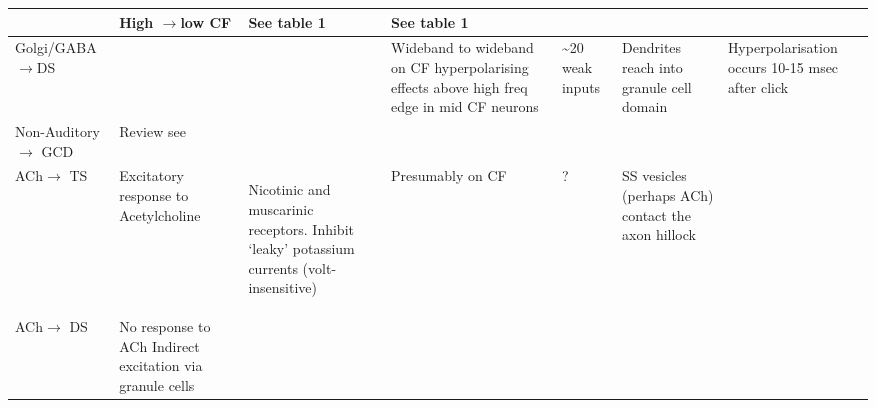 \documentclass[10pt,a4paper]{article}
\begin{document}
\begin{landscape}
\begin{supertabular}{|m{2.121cm}|m{2.899cm}|m{2.243cm}|m{2.986cm}|m{2.294cm}|m{2.245cm}|m{3.303cm}|}
                   \citep{AwatramaniTurecekEtAl:2005}                     & High \ensuremath{\rightarrow}low CF
                      \citep{JosephsonMorest:1998}                        &    See table 1 \citep{SmithRhode:1989}     & See
                     table 1 \citep{SmithRhode:1989}                      & \\\hline
Golgi/GABA
                       \ensuremath{\rightarrow}DS                         & 
\citep{EvansZhao:1998,FerragamoGoldingEtAl:1998a,Mugnaini:1985,MugnainiOsenEtAl:1980,
                          SaintMorestEtAl:1989}                           &                                            & Wideband to wideband on CF
\citep{EvansZhao:1998} hyperpolarising effects above high freq edge in mid
                  CF neurons \citep{PaoliniClark:1999}                    & \~{}20 weak
                   inputs\citep{SaintMorestEtAl:1989}                     & 

   Dendrites reach into granule cell domain \citep{OertelWuEtAl:1990}     & 

Hyperpolarisation occurs 10-15 msec after click
\citep{PaoliniClark:1999}\\\hline
Non-Auditory \ensuremath{\rightarrow} GCD
                                                                          & Review see \citep{OhlroggeDoucetEtAl:2001} &   & & & & \\\hline
                     ACh\ensuremath{\rightarrow} TS                       & 

     Excitatory response to Acetylcholine \citep{FujinoOertel:2001}       & Nicotinic
and muscarinic receptors.  Inhibit {\textquoteleft}leaky{\textquoteright}
potassium currents (volt-insensitive)

                        \citep{FujinoOertel:2001}                         &              Presumably on CF              & ? & SS vesicles (perhaps
       ACh) contact the axon hillock \citep{JuizHelfertEtAl:1996a}        & \\\hline

                     ACh\ensuremath{\rightarrow} DS                       & No response to ACh
\citep{FujinoOertel:2001} Indirect excitation via granule cells
         \citep{MuldersPaoliniEtAl:2003,MuldersWinterEtAl:2002}           &                                            &   & & & 


\\\hline
\end{supertabular}
\end{landscape}
\end{document}

